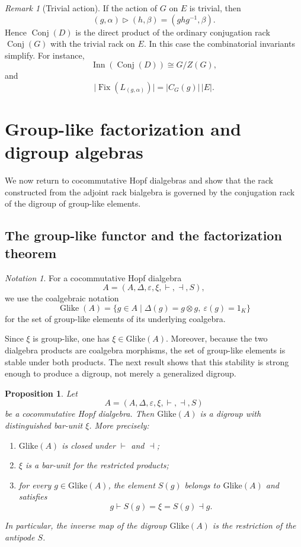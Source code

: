 \documentclass[11pt]{article}
\theoremstyle{plain}
\newtheorem{proposition}[theorem]{Proposition}
\theoremstyle{definition}
\theoremstyle{remark}
\newtheorem{remark}[theorem]{Remark}
\newtheorem{notation}[theorem]{Notation}
\DeclareMathOperator{\Glike}{Glike}
\DeclareMathOperator{\Conj}{Conj}
\begin{document}
	\begin{remark}[Trivial action]\label{rem:trivial-action}
		If the action of \(G\) on \(E\) is trivial, then
		\[
		(g,\alpha)\triangleright(h,\beta)
		=
		(ghg^{-1},\beta).
		\]
		Hence \(\Conj(D)\) is the direct product of the ordinary conjugation rack
		\(\Conj(G)\) with the trivial rack on \(E\). In this case the combinatorial
		invariants simplify. For instance,
		\[
		\operatorname{Inn}(\Conj(D))
		\cong
		G/Z(G),
		\]
		and
		\[
		\lvert\operatorname{Fix}(L_{(g,\alpha)})\rvert
		=
		|C_G(g)|\,|E|.
		\]
	\end{remark}
	
	\section{Group-like factorization and digroup algebras}
	
	We now return to cocommutative Hopf dialgebras and show that the rack
	constructed from the adjoint rack bialgebra is governed by the conjugation
	rack of the digroup of group-like elements.
	
	\subsection{The group-like functor and the factorization theorem}
	
	\begin{notation}\label{not:group-like-hopf-dialgebra}
		For a cocommutative Hopf dialgebra
		\[
		A=(A,\Delta,\varepsilon,\xi,\vdash,\dashv,S),
		\]
		we use the coalgebraic notation
		\[
		\Glike(A)
		=
		\{g\in A\mid \Delta(g)=g\otimes g,\ \varepsilon(g)=1_K\}
		\]
		for the set of group-like elements of its underlying coalgebra.
	\end{notation}
	
	Since \(\xi\) is group-like, one has \(\xi\in\mathrm{Glike}(A)\).
	Moreover, because the two dialgebra products are coalgebra morphisms,
	the set of group-like elements is stable under both products. The next
	result shows that this stability is strong enough to produce a digroup,
	not merely a generalized digroup.
	
	\begin{proposition}\label{prop:glike-digroup}
		Let
		\[
		A=(A,\Delta,\varepsilon,\xi,\vdash,\dashv,S)
		\]
		be a cocommutative Hopf dialgebra. Then \(\mathrm{Glike}(A)\) is a
		digroup with distinguished bar-unit \(\xi\). More precisely:
		\begin{enumerate}
			\item \(\mathrm{Glike}(A)\) is closed under \(\vdash\) and \(\dashv\);
			\item \(\xi\) is a bar-unit for the restricted products;
			\item for every \(g\in\mathrm{Glike}(A)\), the element \(S(g)\) belongs
			to \(\mathrm{Glike}(A)\) and satisfies
			\[
			g\vdash S(g)=\xi=S(g)\dashv g.
			\]
		\end{enumerate}
		In particular, the inverse map of the digroup \(\mathrm{Glike}(A)\) is the
		restriction of the antipode \(S\).
	\end{proposition}
	
\end{document}
